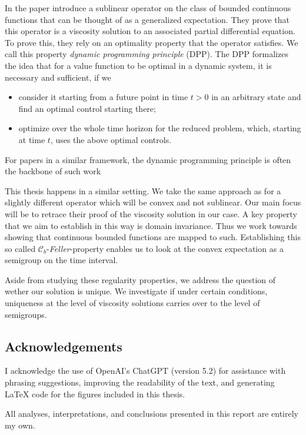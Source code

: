 In the paper  introduce a sublinear operator on the class of bounded continuous functions that can be thought of as a generalized expectation. They prove that this operator is a viscosity solution to an associated partial differential equation. To prove this, they rely on an optimality property that the operator satisfies. We call this property \emph{dynamic programming principle} (DPP). The DPP formalizes the idea that for a value function to be optimal in a dynamic system, it is necessary and sufficient, if we
\begin{itemize}
	\item consider it starting from a future point in time $t > 0$ in an arbitrary state and find an optimal control starting there;
	\item optimize over the whole time horizon for the reduced problem, which, starting at time $t$, uses the above optimal controls.
\end{itemize}
For papers in a similar framework, the dynamic programming principle is often the backbone of such work 

This thesis happens in a similar setting. We take the same approach as  for a slightly different operator which will be convex and not sublinear. Our main focus will be to retrace their proof of the viscosity solution in our case. A key property that we aim to establish in this way is domain invariance. Thus we work towards showing that continuous bounded functions are mapped to such. Establishing this so called $\mathcal{C}_b$-\emph{Feller}-property enables us to look at the convex expectation as a semigroup on the time interval.

Aside from studying these regularity properties, we address the question of wether our solution is unique. We investigate if under certain conditions, uniqueness at the level of viscosity solutions carries over to the level of semigroups. \newpage


	\subsection*{Acknowledgements}
I acknowledge the use of OpenAI’s ChatGPT (version 5.2) for assistance with phrasing suggestions, improving the readability of the text, and generating LaTeX code for the figures included in this thesis.

All analyses, interpretations, and conclusions presented in this report are entirely my own.


